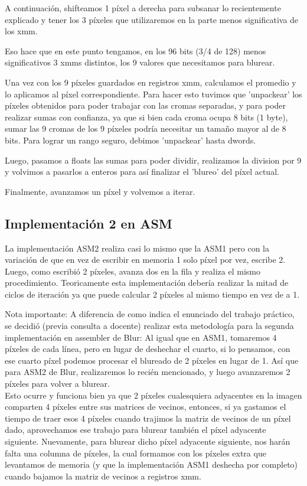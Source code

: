 A continuación, shifteamos 1 píxel a derecha para subsanar lo recientemente explicado y tener los 3 píxeles que utilizaremos en la parte menos significativa de los xmm.

Eso hace que en este punto tengamos, en los 96 bits (3/4 de 128) menos significativos 3 xmms distintos, los 9 valores que necesitamos para blurear.

Una vez con los 9 píxeles guardados en registros xmm, calculamos el promedio y lo aplicamos al píxel correspondiente. Para hacer esto tuvimos que 'unpackear' los píxeles obtenidos para poder trabajar con las cromas separadas, y para poder realizar sumas con confianza, ya que si bien cada croma ocupa 8 bits (1 byte), sumar las 9 cromas de los 9 píxeles podría necesitar un tamaño mayor al de 8 bits. Para lograr un rango seguro, debimos 'unpackear' hasta dwords.

Luego, pasamos a floats las sumas para poder dividir, realizamos la division por 9 y volvimos a pasarlos a enteros para así finalizar el 'blureo' del píxel actual.

Finalmente, avanzamos un píxel y volvemos a iterar.\\

\subsection{Implementación 2 en ASM}
La implementación ASM2 realiza casi lo mismo que la ASM1 pero con la variación de que en vez de escribir en memoria 1 solo píxel por vez, escribe 2. Luego, como escribió 2 píxeles, avanza dos en la fila y realiza el mismo procedimiento. Teoricamente esta implementación debería realizar la mitad de ciclos de iteración ya que puede calcular 2 píxeles al mismo tiempo en vez de a 1.

Nota importante: A diferencia de como indica el enunciado del trabajo práctico, se decidió (previa consulta a docente) realizar esta metodología para la segunda implementación en assembler de Blur: 
Al igual que en ASM1, tomaremos 4 píxeles de cada línea, pero en lugar de deshechar el cuarto, si lo pensamos, con ese cuarto píxel podemos procesar el blureado de 2 píxeles en lugar de 1. Así que para ASM2 de Blur, realizaremos lo recién mencionado, y luego avanzaremos 2 píxeles para volver a blurear.\\
Esto ocurre y funciona bien ya que 2 píxeles cualesquiera adyacentes en la imagen comparten 4 píxeles entre sus matrices de vecinos, entonces, si ya gastamos el tiempo de traer esos 4 píxeles cuando trajimos la matriz de vecinos de un píxel dado, aprovechamos ese trabajo para blurear también el píxel adyacente siguiente. Nuevamente, para blurear dicho píxel adyacente siguiente, nos harán falta una columna de píxeles, la cual formamos con los píxeles extra que levantamos de memoria (y que la implementación ASM1 deshecha por completo) cuando bajamos la matriz de vecinos a registros xmm. 

